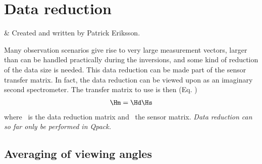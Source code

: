 %
%
\chapter{Data reduction}


%
%
 & Created and written by Patrick Eriksson.\\
\stophistory


%
%
%



%
%
Many observation scenarios give rise to very large measurement
vectors, larger than can be handled practically during the inversions,
and some kind of reduction of the data size is needed. This data
reduction can be made part of the sensor transfer matrix. In fact, the
data reduction can be viewed upon as an imaginary second spectrometer.
The transfer matrix to use is then (Eq. )
\begin{eqnarray}
  \Hm = \Hd \Hs  \nonumber
\end{eqnarray}
where \Hd\ is the data reduction matrix and \Hs\ the sensor matrix.
{\it Data reduction can so far only be performed in Qpack.}


\section{Averaging of viewing angles}
 
